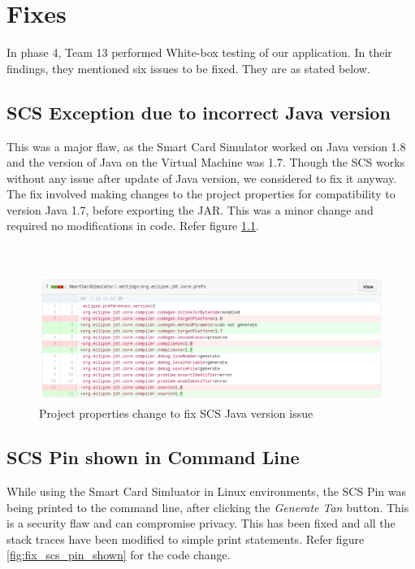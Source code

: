 \chapter{Fixes}

In phase 4, Team 13 performed White-box testing of our application. In their findings, they mentioned six issues to be fixed. They are as stated below.

\section{SCS Exception due to incorrect Java version}
This was a major flaw, as the Smart Card Simulator worked on Java version 1.8 and the version of Java on the Virtual Machine was 1.7. Though the SCS works without any issue after update of Java version, we considered to fix it anyway.
The fix involved making changes to the project properties for compatibility to version Java 1.7, before exporting the JAR. This was a minor change and required no modifications in code. Refer figure \ref{fig:fix_java_version}. \\ \\ \\

\begin{figure}[ht]
	\centering
	\includegraphics[width=.8\linewidth]{figures/fix_java_version.png}
	\caption{Project properties change to fix SCS Java version issue}
	\label{fig:fix_java_version}
\end{figure}

\clearpage

\section{SCS Pin shown in Command Line}
While using the Smart Card Simluator in Linux environments, the SCS Pin was being printed to the command line, after clicking the \textit{Generate Tan} button. This is a security flaw and can compromise privacy. This has been fixed and all the stack traces have been modified to simple print statements. Refer figure \ref{fig:fix_scs_pin_shown} for the code change. \\ \\ \\

